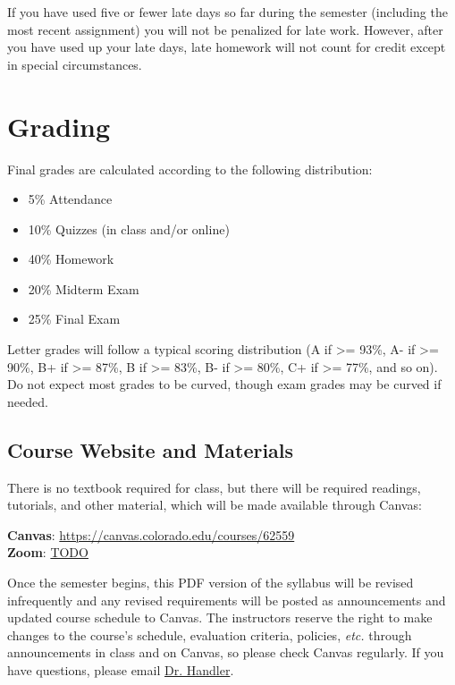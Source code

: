 \documentclass[10pt]{memoir}
\makeatletter
\def\myzoomurl{TODO}
\def\mycanvasurl{https://canvas.colorado.edu/courses/62559}
\def\instructorAlastname{Handler}
\def\instructorAemail{abram.handler@colorado.edu}
\makeatother
\begin{document}
If you have used five or fewer late days so far during the semester (including the most recent assignment) you will not be penalized for late work. However, after you have used up your late days, late homework will not count for credit except in special circumstances.

\section{Grading}

Final grades are calculated according to the following distribution:
\begin{itemize}
\item 5\% Attendance
\item 10\% Quizzes (in class and/or online)
\item 40\% Homework
\item 20\% Midterm Exam
\item 25\% Final Exam
\end{itemize}

Letter grades will follow a typical scoring distribution (A if >= 93\%, A- if >= 90\%, B+ if >=
87\%, B if >= 83\%, B- if >= 80\%, C+ if >= 77\%, and so on). Do not expect most grades to be
curved, though exam grades may be curved if needed.


\subsection{Course Website and Materials}
There is no textbook required for class, but there will be required readings, tutorials, and other material, which will be made available through Canvas:
\vspace{-8pt}
    \begin{center}
    \Large{\textbf{Canvas}: \href{\mycanvasurl}{\mycanvasurl}}\\
    \Large{\textbf{Zoom}: \href{\myzoomurl}{\myzoomurl}}
    \end{center}
\vspace{-8pt}
Once the semester begins, this PDF version of the syllabus will be revised infrequently and any revised requirements will be posted as announcements and updated course schedule to Canvas. The instructors reserve the right to make changes to the course's schedule, evaluation criteria, policies, \textit{etc.} through announcements in class and on Canvas, so please check Canvas regularly. If you have questions, please email \href{mailto:\instructorAemail}{Dr. \instructorAlastname}.
\end{document}
